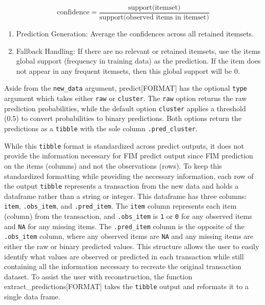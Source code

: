\documentclass[
  article]{jss}
\begin{document}
\[
\text{confidence} = \frac{\text{support(itemset)}}{\text{support(observed items in itemset)}}
\]

\begin{enumerate}
\def\labelenumi{\arabic{enumi}.}
\setcounter{enumi}{3}
\item
  Prediction Generation: Average the confidences across all retained
  itemsets.
\item
  Fallback Handling: If there are no relevant or retained itemsets, use
  the items global support (frequency in training data) as the
  prediction. If the item does not appear in any frequent itemsets, then
  this global support will be 0.
\end{enumerate}

Aside from the \texttt{new\_data} argument, predict{[}FORMAT{]} has the
optional \texttt{type} argument which takes either
\texttt{\textquotesingle{}raw\textquotesingle{}} or
\texttt{\textquotesingle{}cluster\textquotesingle{}}. The
\texttt{\textquotesingle{}raw\textquotesingle{}} option returns the raw
prediction probabilities, while the default option
\texttt{\textquotesingle{}cluster\textquotesingle{}} applies a threshold
(0.5) to convert probabilities to binary predictions. Both options
return the predictions as a \texttt{tibble} with the sole column
\texttt{.pred\_cluster}.

While this \texttt{tibble} format is standardized across 
predict outputs, it does not provide the information necessary for FIM
predict output since FIM prediction on the items (columns) and not the
observations (rows). To keep this standardized formatting while
providing the necessary information, each row of the output
\texttt{tibble} represents a transaction from the new data and holds a
dataframe rather than a string or integer. This dataframe has three
columns: \texttt{item}, \texttt{.obs\_item}, and \texttt{.pred\_item}.
The \texttt{item} column represents each item (column) from the
transaction, and \texttt{.obs\_item} is \texttt{1} or \texttt{0} for any
observed items and \texttt{NA} for any missing items. The
\texttt{.pred\_item} column is the opposite of the \texttt{.obs\_item}
column, where any observed items are \texttt{NA} and any missing items
are either the raw or binary predicted values. This structure allows the
user to easily identify what values are observed or predicted in each
transaction while still containing all the information necessary to
recreate the original transaction dataset. To assist the user with
reconstruction, the function extract\_predictions{[}FORMAT{]} takes the
\texttt{tibble} output and reformats it to a single data frame.
\end{document}
